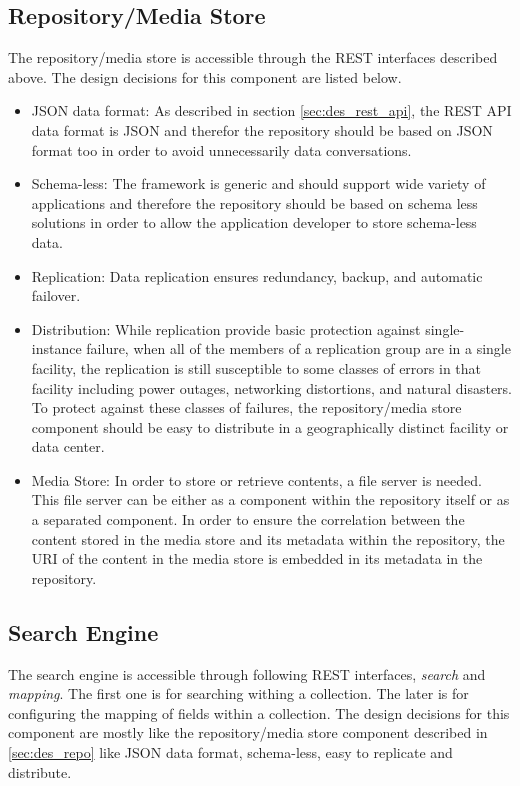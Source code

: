 \subsection{Repository/Media Store \label{sec:des_repo}}

The repository/media store is accessible through the \ac{REST} interfaces described above. The design decisions for this component are listed below.

\begin{itemize}
\item {JSON data format:} As described in section \ref{sec:des_rest_api}, the \ac{REST} \ac{API} data format is \ac{JSON} and therefor the repository should be based on \ac{JSON} format too in order to avoid unnecessarily data conversations.

\item {Schema-less:} The framework is generic and should support wide variety of applications and therefore the repository should be based on schema less solutions in order to allow the application developer to store schema-less data.

\item {Replication:} Data replication ensures redundancy, backup, and automatic failover.

\item {Distribution:} While replication provide basic protection against single-instance failure, when all of the members of a replication group are in a single facility, the replication is still susceptible to some classes of errors in that facility including power outages, networking distortions, and natural disasters. To protect against these classes of failures, the repository/media store component should be easy to distribute in a geographically distinct facility or data center.

\item {Media Store:} In order to store or retrieve contents, a file server is needed. This file server can be either as a component within the repository itself or as a separated component. In order to ensure the correlation between the content stored in the media store and its metadata within the repository, the \ac{URI} of the content in the media store is embedded in its metadata in the repository.
\end{itemize}
 
\subsection{Search Engine\label{sec:des_se_en}}
The search engine is accessible through following \ac{REST} interfaces, \textit{search} and \textit{mapping}. The first one is for searching withing a collection. The later is for configuring the mapping of fields within a collection. The design decisions for this component are mostly like the repository/media store component described in \ref{sec:des_repo} like \ac{JSON} data format, schema-less, easy to replicate and distribute.%


